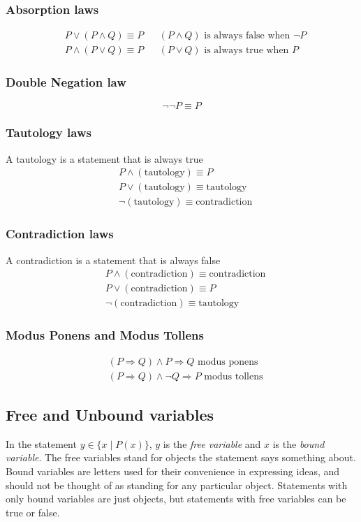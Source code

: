 \documentclass{article}
\begin{document}
\subsubsection{Absorption laws}
	\begin{align*}
		&P\vee (P\wedge Q)\equiv P&&(P\wedge Q)\text{ is always false when \(\neg P\)}\\
		&P\wedge (P\vee Q)\equiv P&&(P\vee Q)\text{ is always true when \(P\)}
	\end{align*}
\subsubsection{Double Negation law}
	\begin{displaymath}
		\neg\neg P\equiv P
	\end{displaymath}
\subsubsection{Tautology laws}
	A tautology is a statement that is always true
	\begin{align*}
		&P\wedge(\text{tautology})\equiv P\\
		&P\vee(\text{tautology})\equiv \text{tautology}\\
		&\neg(\text{tautology})\equiv \text{contradiction}
	\end{align*}
\subsubsection{Contradiction laws}
	A contradiction is a statement that is always false
	\begin{align*}
		&P\wedge(\text{contradiction})\equiv \text{contradiction}\\
		&P\vee(\text{contradiction})\equiv P\\
		&\neg(\text{contradiction})\equiv \text{tautology}
	\end{align*}
\subsubsection{Modus Ponens and Modus Tollens}
	\begin{align*}
		&(P\Rightarrow Q)\wedge P\Longrightarrow Q\text{ modus ponens}\\
		&(P\Rightarrow Q)\wedge\neg Q\Longrightarrow P\text{ modus tollens}
	\end{align*}
\subsection{Free and Unbound variables}
In the statement \(y\in\{x\mid P(x)\}\), \(y\) is the \emph{free variable} and \(x\) is the \emph{bound variable}. The free variables stand for objects the statement says something about. Bound variables are letters used for their convenience in expressing ideas, and should not be thought of as standing for any particular object. Statements with only bound variables are just objects, but statements with free variables can be true or false.
\end{document}

